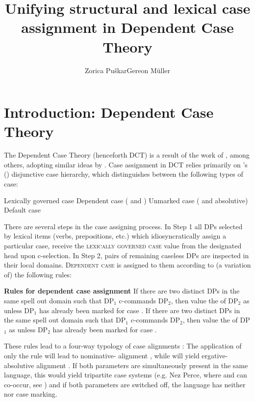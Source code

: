 \documentclass[output=paper,modfonts,newtxmath,hidelinks]{langscibook}
\title{Unifying structural and lexical case assignment in Dependent Case Theory}
\author{Zorica Puškar\affiliation{Leibniz-Zentrum Allgemeine Sprachwissenschaft, Berlin}\lastand  Gereon Müller\affiliation{University of Leipzig}}
\begin{document}
\maketitle
{}

\section{Introduction: Dependent Case Theory} 


The Dependent Case Theory (henceforth DCT) is a result of the work of \citep{marantz91,mcfadden04,bakervinokurova,baker12,baker15}, among others, adopting similar ideas by \citet{yipetal87,bittnerhale96,kiparsky92,kiparsky2001,wunderlich97,stiebels2002}. Case assignment in DCT relies primarily on \citeauthor{marantz91}'s (\citeyear[24]{marantz91}) disjunctive case hierarchy, which distinguishes between the following types of case:

\ea Lexically governed case \before{} Dependent case ( and ) \before{} Unmarked case ( and absolutive) \before{} Default case 
\z

\noindent There are several steps in the case assigning process. In Step 1 all DPs selected by lexical items (verbs, prepositions, etc.) which idiosyncratically assign a particular case, receive the \textsc{lexically governed case} value from the designated head upon c-selection. In Step 2, pairs of remaining caseless DPs are inspected in their local domains. \textsc{Dependent case} is assigned to them according to (a variation of) the following  rules: 

\ea\label{16:ex2} \textbf{Rules for dependent case assignment} \citep[48-49]{baker15}
\ea\label{16:ex2a} If there are two distinct DPs in the same spell out domain such that DP$_1$ c-commands DP$_2$, then value the  of DP$_2$ as  unless DP$_1$ has already been marked for case . 
\ex\label{16:ex2b} If there are two distinct DPs in the same spell out domain such that DP$_1$ c-commands DP$_2$, then value the  of DP$_1$ as  unless DP$_2$ has already been marked for case . 
\z \z

\noindent These rules lead to a four-way typology of case alignments \citep{levinpreminger}: The application of only the rule  will lead to nominative- alignment , while  will yield ergative-absolutive alignment . If both parameters are simultaneously present in the same language, this would yield tripartite case systems (e.g. Nez Perce, where  and  can co-occur, see \citealt{baker15}) and if both parameters are switched off, the language has neither  nor  case marking.
\end{document}
